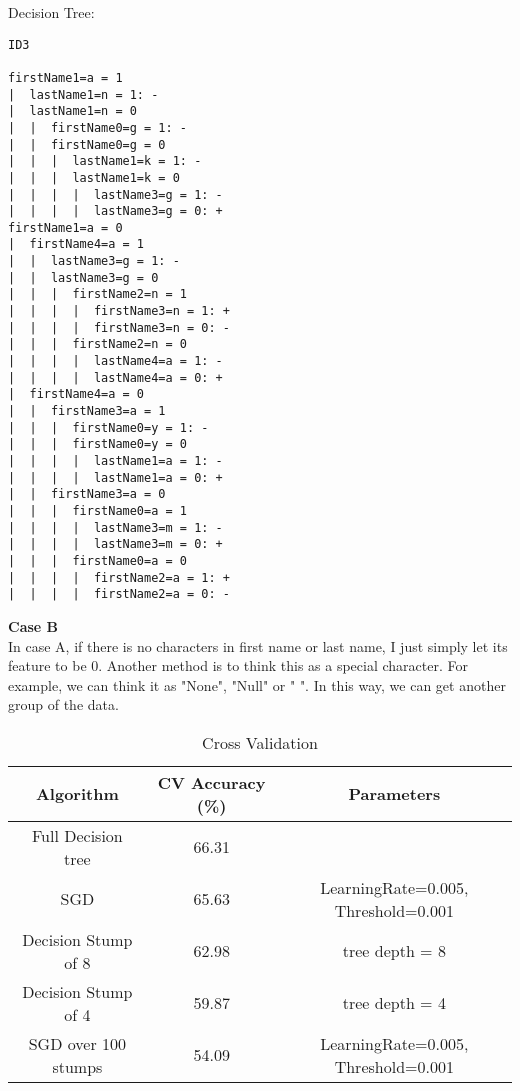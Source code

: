 \begin{enumerate}
\begin{enumerate}
Decision Tree:

\begin{lstlisting}
ID3

firstName1=a = 1
|  lastName1=n = 1: -
|  lastName1=n = 0
|  |  firstName0=g = 1: -
|  |  firstName0=g = 0
|  |  |  lastName1=k = 1: -
|  |  |  lastName1=k = 0
|  |  |  |  lastName3=g = 1: -
|  |  |  |  lastName3=g = 0: +
firstName1=a = 0
|  firstName4=a = 1
|  |  lastName3=g = 1: -
|  |  lastName3=g = 0
|  |  |  firstName2=n = 1
|  |  |  |  firstName3=n = 1: +
|  |  |  |  firstName3=n = 0: -
|  |  |  firstName2=n = 0
|  |  |  |  lastName4=a = 1: -
|  |  |  |  lastName4=a = 0: +
|  firstName4=a = 0
|  |  firstName3=a = 1
|  |  |  firstName0=y = 1: -
|  |  |  firstName0=y = 0
|  |  |  |  lastName1=a = 1: -
|  |  |  |  lastName1=a = 0: +
|  |  firstName3=a = 0
|  |  |  firstName0=a = 1
|  |  |  |  lastName3=m = 1: -
|  |  |  |  lastName3=m = 0: +
|  |  |  firstName0=a = 0
|  |  |  |  firstName2=a = 1: +
|  |  |  |  firstName2=a = 0: -

\end{lstlisting}

{\bf Case B}\\

In case A, if there is no characters in first name or last name, I just simply let its feature to be 0. Another method is to think this as a special character. For example, we can think it as "None", "Null" or " ". In this way, we can get another group of the data.\\

\begin{center}
\begin{table}[H]
\caption {Cross Validation}
\centering
\begin{tabular}{|c|c|c|}

\hline
{\bf Algorithm} & {\bf CV Accuracy (\%)} & {\bf Parameters} \\
\hline
Full Decision tree & 66.31 & {} \\
\hline
SGD & 65.63 & LearningRate=0.005, Threshold=0.001 \\
\hline
Decision Stump of 8 & 62.98 & tree depth = 8  \\
\hline
Decision Stump of 4 & 59.87 & tree depth = 4  \\
\hline
SGD over 100 stumps & 54.09 & LearningRate=0.005, Threshold=0.001 \\
\hline
\end{tabular}
\end{table}
\end{center}



\end{enumerate}

\end{enumerate}



